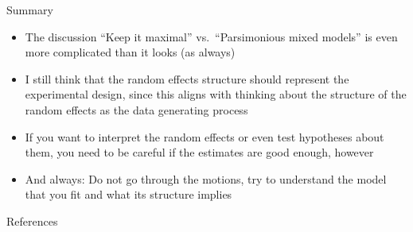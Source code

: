 \documentclass[aspectratio=169]{beamer}
\begin{document}
\begin{frame}[<+->]{Summary}
  \begin{itemize}
    \item The discussion ``Keep it maximal'' \citep{Barr2013} vs.\
      ``Parsimonious mixed models'' \citep{Bates2018} is even more complicated
      than it looks (as always)
    \item I still think that the random effects structure should represent the
      experimental design, since this aligns with thinking about the structure
      of the random effects as the data generating process
    \item If you want to interpret the random effects or even test hypotheses
      about them, you need to be careful if the estimates are good enough,
      however
    \item And always: Do not go through the motions, try to understand the
      model that you fit and what its structure implies
  \end{itemize}
\end{frame}

\appendix

\begin{frame}{References}
  \printbibliography
\end{frame}
\end{document}
